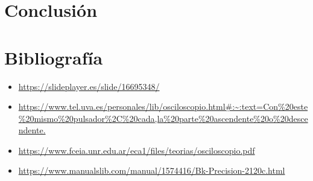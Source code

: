 \newpage
\section{Conclusión}






\vspace{3cm}
\section{Bibliografía}
\begin{itemize}
   \item \url{https://slideplayer.es/slide/16695348/}
   \item \url{https://www.tel.uva.es/personales/lib/osciloscopio.html#:~:text=Con%20este%20mismo%20pulsador%2C%20cada,la%20parte%20ascendente%20o%20descendente.}
   \item \url{https://www.fceia.unr.edu.ar/eca1/files/teorias/osciloscopio.pdf}
    \item \url{https://www.manualslib.com/manual/1574416/Bk-Precision-2120c.html}
\end{itemize}


